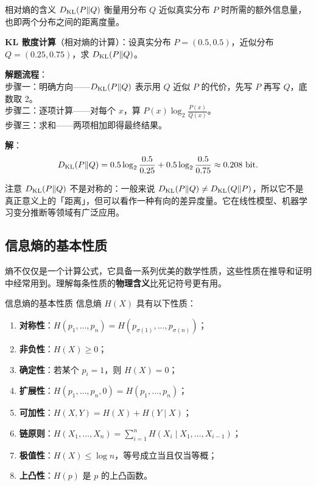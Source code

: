 \begin{keypoint}{相对熵的含义}
$D_{\mathrm{KL}}(P\|Q)$ 衡量用分布 $Q$ 近似真实分布 $P$ 时所需的额外信息量，也即两个分布之间的距离度量。
\end{keypoint}

\begin{example}
\label{ex:ch2-kl-divergence}
\textbf{KL 散度计算}（相对熵的计算）：设真实分布 $P=(0.5,0.5)$，近似分布 $Q=(0.25,0.75)$，求 $D_{\mathrm{KL}}(P\|Q)$。

\noindent \textbf{解题流程}：\\[2pt]
步骤一：明确方向——$D_{\mathrm{KL}}(P\|Q)$ 表示用 $Q$ 近似 $P$ 的代价，先写 $P$ 再写 $Q$，底数取 2。\\
步骤二：逐项计算——对每个 $x$，算 $P(x)\log_2\frac{P(x)}{Q(x)}$。\\
步骤三：求和——两项相加即得最终结果。

\textbf{解}：\\[2pt]
\[
D_{\mathrm{KL}}(P\|Q)=0.5\log_2\frac{0.5}{0.25}+0.5\log_2\frac{0.5}{0.75}\approx 0.208\text{ bit}.
\]

注意 $D_{\mathrm{KL}}(P\|Q)$ 不是对称的：一般来说 $D_{\mathrm{KL}}(P\|Q) \neq D_{\mathrm{KL}}(Q\|P)$，所以它不是真正意义上的「距离」，但可以看作一种有向的差异度量。它在线性模型、机器学习变分推断等领域有广泛应用。
\end{example}

\subsection{信息熵的基本性质}

熵不仅仅是一个计算公式，它具备一系列优美的数学性质，这些性质在推导和证明中经常用到。理解每条性质的\textbf{物理含义}比死记符号更有用。

\begin{theoremBox}{信息熵的基本性质}
信息熵 $H(X)$ 具有以下性质：
\begin{enumerate}
  \item \textbf{对称性}：$H(p_1,\dots,p_n)=H(p_{\sigma(1)},\dots,p_{\sigma(n)})$；
  \item \textbf{非负性}：$H(X) \ge 0$；
  \item \textbf{确定性}：若某个 $p_i=1$，则 $H(X)=0$；
  \item \textbf{扩展性}：$H(p_1,\dots,p_n,0)=H(p_1,\dots,p_n)$；
  \item \textbf{可加性}：$H(X,Y)=H(X)+H(Y \mid X)$；
  \item \textbf{链原则}：$H(X_1,\dots,X_n)=\sum_{i=1}^{n}H(X_i \mid X_1,\dots,X_{i-1})$；
  \item \textbf{极值性}：$H(X) \le \log n$，等号成立当且仅当等概；
  \item \textbf{上凸性}：$H(p)$ 是 $p$ 的上凸函数。
\end{enumerate}
\end{theoremBox}

